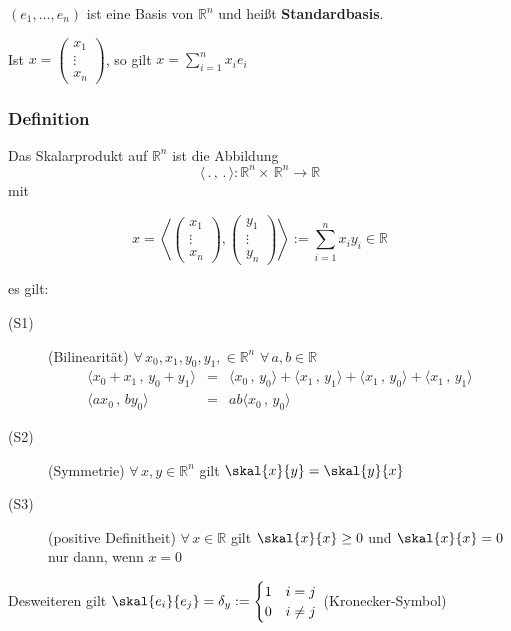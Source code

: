 \((e_1,\dots,e_n)\) ist eine Basis von $\mathbb{R}^n$ und heißt {\bfseries Standardbasis}. 

Ist \(x = \begin{pmatrix} x_1 \\ \vdots \\ x_n \end{pmatrix}\), so gilt \(x=\sum\limits^{n}_{i=1}x_ie_i\)

\subsubsection{Definition} %
\label{ssub:definition}

Das Skalarprodukt auf $\mathbb{R}^n$ ist die Abbildung \[ \langle\, .\,,\,.\,\rangle : \mathbb{R}^n \times \, \mathbb{R}^n \to \mathbb{R}\] mit 

\[
 x = \left< \begin{pmatrix} x_1 \\ \vdots \\ x_n \end{pmatrix} , \begin{pmatrix} y_1 \\ \vdots \\ y_n \end{pmatrix} \right> := \sum_{i=1}^{n}x_iy_i \in \mathbb{R} 
 \]
 
es gilt:
\begin{description}
	\item[(S1)] (Bilinearität) $\forall \, x_0,x_1,y_0,y_1, \in \mathbb{R}^n \hspace{4pt} \forall \, a,b \in \mathbb{R}$
	 \begin{eqnarray}
	 \langle x_0+x_1\,,\, y_0+y_1\rangle & =& \langle x_0\,,\, y_0\rangle + \langle x_1\,,\,y_1\rangle + \langle x_1\,,\, y_0\rangle + \langle x_1\,,\, y_1\rangle \\
	 \langle ax_0\,,\, by_0\rangle &=& ab \langle x_0\,,\, y_0\rangle 
	 \end{eqnarray}
	 \item[(S2)](Symmetrie) $\forall \, x,y \in \mathbb{R}^n$ gilt $\skal{x}{y} = \skal{y}{x}$
	
	\item[(S3)](positive Definitheit) $\forall \, x \in \mathbb{R}$ gilt $\skal{x}{x} \geq 0$ und $\skal{x}{x}=0$ nur dann, wenn $x=0$
\end{description}
Desweiteren gilt $\skal{e_i}{e_j}=\delta_y := \begin{cases} 1 & i=j \\ 0 &i\neq j \end{cases}$ \hspace{1cm} (Kronecker-Symbol)


